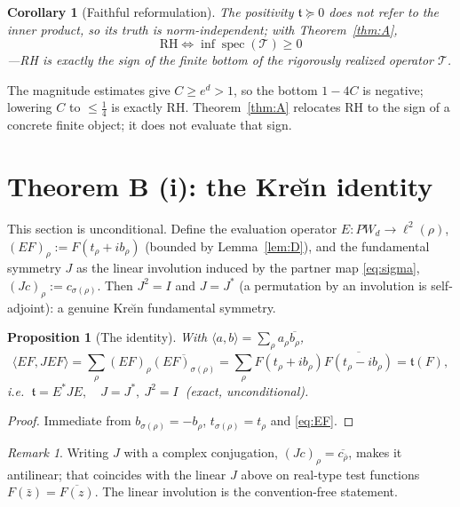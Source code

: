 \documentclass[11pt]{amsart}
\newtheorem{proposition}[theorem]{Proposition}
\newtheorem{corollary}[theorem]{Corollary}
\theoremstyle{definition}
\theoremstyle{remark}
\newtheorem{remark}[theorem]{Remark}
\newcommand{\spec}{\operatorname{spec}}
\newcommand{\PW}{\mathit{PW}_d}
\newcommand{\tform}{\mathfrak t}
\newcommand{\Top}{\mathcal T}
\begin{document}
\begin{corollary}[Faithful reformulation]\label{cor:Aprime}
The positivity $\tform\succeq0$ does not refer to the inner product, so its truth is
norm-independent; with Theorem~\ref{thm:A},
\[
\boxed{\ \mathrm{RH}\iff\inf\spec(\Top)\ge0\ }
\]
---RH is exactly the sign of the finite bottom of the rigorously realized operator $\Top$.
\end{corollary}

The magnitude estimates give $C\ge e^{d}>1$, so the bottom $1-4C$ is negative; lowering
$C$ to $\le\tfrac14$ is exactly RH. Theorem~\ref{thm:A} relocates RH to the sign of a
concrete finite object; it does not evaluate that sign.

\section{Theorem B (i): the Kre\u{\i}n identity}\label{sec:krein}

This section is unconditional. Define the evaluation operator
$E:\PW\to\ell^{2}(\rho)$, $(EF)_\rho:=F(t_\rho+ib_\rho)$ (bounded by Lemma~\ref{lem:D}),
and the fundamental symmetry $J$ as the linear involution induced by the partner map
\eqref{eq:sigma}, $(Jc)_\rho:=c_{\sigma(\rho)}$. Then $J^{2}=I$ and $J=J^{*}$ (a
permutation by an involution is self-adjoint): a genuine Kre\u{\i}n fundamental symmetry.

\begin{proposition}[The identity]\label{prop:identity}
With $\langle a,b\rangle=\sum_\rho a_\rho\overline{b_\rho}$,
\[
\langle EF,JEF\rangle=\sum_\rho (EF)_\rho\overline{(EF)_{\sigma(\rho)}}
=\sum_\rho F(t_\rho+ib_\rho)\overline{F(t_\rho-ib_\rho)}=\tform(F),
\]
i.e. $\boxed{\ \tform=E^{*}JE,\quad J=J^{*},\ J^{2}=I\ }$ (exact, unconditional).
\end{proposition}
\begin{proof}
Immediate from $b_{\sigma(\rho)}=-b_\rho$, $t_{\sigma(\rho)}=t_\rho$ and \eqref{eq:EF}.
\end{proof}

\begin{remark}
Writing $J$ with a complex conjugation, $(Jc)_\rho=\overline{c_{\bar\rho}}$, makes it
antilinear; that coincides with the linear $J$ above on real-type test functions
$F(\bar z)=\overline{F(z)}$. The linear involution is the convention-free statement.
\end{remark}
\end{document}
